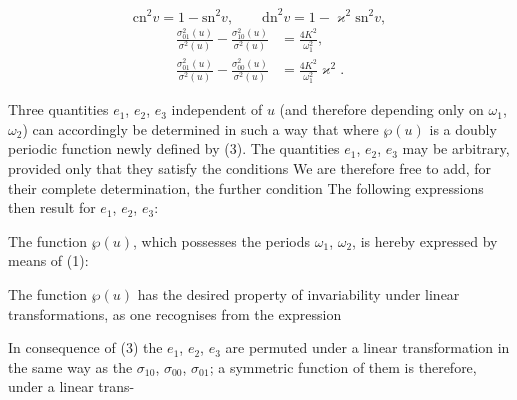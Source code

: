 \[ \mathrm{cn}^2v = 1-\mathrm{sn}^2v, \qquad \mathrm{dn}^2v = 1-\varkappa^2\mathrm{sn}^2v, \]
\[
\begin{aligned}
\frac{\sigma_{01}^2(u)}{\sigma^2(u)}-\frac{\sigma_{10}^2(u)}{\sigma^2(u)} &= \frac{4K^2}{\omega_1^2}, \\
\frac{\sigma_{01}^2(u)}{\sigma^2(u)}-\frac{\sigma_{00}^2(u)}{\sigma^2(u)} &= \frac{4K^2}{\omega_1^2}\varkappa^2.
\end{aligned}
\]

Three quantities $e_1$, $e_2$, $e_3$ independent of $u$ (and therefore depending only on
$\omega_1$, $\omega_2$) can accordingly be determined in such a way that
where $\wp(u)$ is a doubly periodic function newly defined by (3). The
quantities $e_1$, $e_2$, $e_3$ may be arbitrary, provided only that they satisfy the conditions
We are therefore free to add, for their complete determination, the further condition
The following expressions then result for $e_1$, $e_2$, $e_3$:

The function $\wp(u)$, which possesses the periods $\omega_1$, $\omega_2$, is hereby expressed by means of (1):

The function $\wp(u)$ has the desired property of invariability under linear
transformations, as one recognises from the expression

In consequence of (3) the $e_1$, $e_2$, $e_3$ are permuted under a linear transformation
in the same way as the $\sigma_{10}$, $\sigma_{00}$, $\sigma_{01}$; a symmetric function
of them is therefore, under a linear trans-
